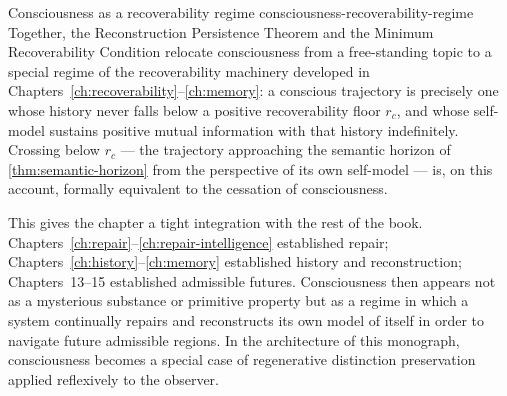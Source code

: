 \documentclass[12pt,twoside,openright]{book}
\begin{document}
\begin{remark}{Consciousness as a recoverability regime}%
  {consciousness-recoverability-regime}
  Together, the Reconstruction Persistence Theorem and the
  Minimum Recoverability Condition relocate consciousness
  from a free-standing topic to a special regime of the
  recoverability machinery developed in
  Chapters~\ref{ch:recoverability}--\ref{ch:memory}: a
  conscious trajectory is precisely one whose history never
  falls below a positive recoverability floor $r_c$, and
  whose self-model sustains positive mutual information with
  that history indefinitely. Crossing below $r_c$ --- the
  trajectory approaching the semantic horizon of
  \cref{thm:semantic-horizon} from the perspective of its
  own self-model --- is, on this account, formally
  equivalent to the cessation of consciousness.
\end{remark}

This gives the chapter a tight integration with the rest of
the book. Chapters~\ref{ch:repair}--\ref{ch:repair-intelligence}
established repair; Chapters~\ref{ch:history}--\ref{ch:memory}
established history and reconstruction; Chapters~13--15
established admissible futures. Consciousness then appears
not as a mysterious substance or primitive property but as
a regime in which a system continually repairs and
reconstructs its own model of itself in order to navigate
future admissible regions. In the architecture of this
monograph, consciousness becomes a special case of
regenerative distinction preservation applied reflexively
to the observer.
\end{document}
